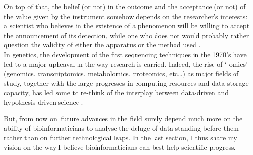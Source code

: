 On top of that, the belief (or not) in the outcome and the acceptance (or not) of the value given by the instrument somehow depends on the researcher's interests: a scientist who believes in the existence of a phenomenon will be willing to accept the announcement of its detection, while one who does not would probably rather question the validity of either the apparatus or the method used \citep{gingras2017determinants}.\\


In genetics, the development of the first sequencing techniques in the 1970's have led to a major upheaval in the way research is carried.
Indeed, the rise of ‘-omics’ (genomics, transcriptomics, metabolomics, proteomics, etc…) as major fields of study, together with the large progresses in computing resources and data storage capacity, has led some to re-think of the interplay between data-driven and hypothesis-driven science \citep{kell2004here, mazzocchi2015could}.

But, from now on, future advances in the field surely depend much more on the ability of bioinformaticians to analyse the deluge of data standing before them rather than on further technological leaps.
In the last section, I thus share my vision on the way I believe bioinformaticians can best help scientific progress.




